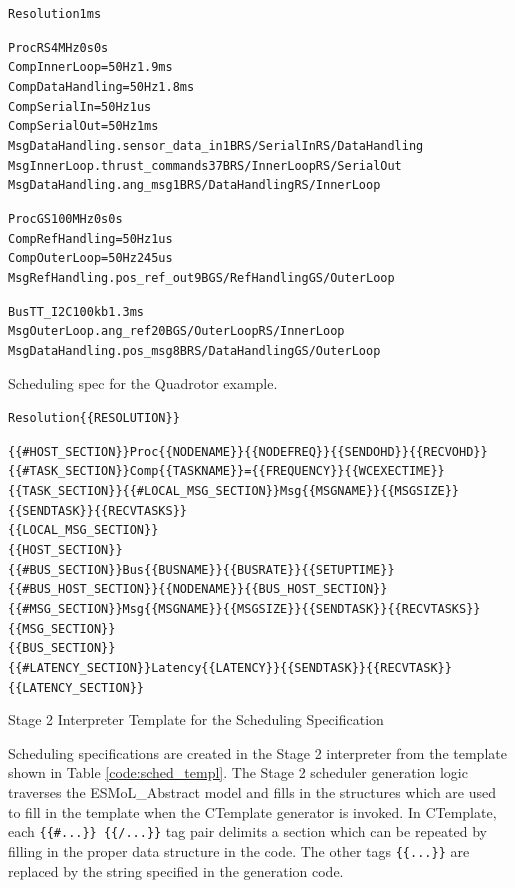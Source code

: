 \begin{table}
\centering
\begin{alltt}
Resolution 1ms

Proc RS 4MHz 0s 0s
Comp InnerLoop =50Hz 1.9ms
Comp DataHandling =50Hz 1.8ms
Comp SerialIn =50Hz 1us
Comp SerialOut =50Hz 1ms
Msg DataHandling.sensor_data_in 1B RS/SerialIn RS/DataHandling 
Msg InnerLoop.thrust_commands 37B RS/InnerLoop RS/SerialOut
Msg DataHandling.ang_msg 1B RS/DataHandling RS/InnerLoop 

Proc GS 100MHz 0s 0s
Comp RefHandling =50Hz 1us
Comp OuterLoop =50Hz 245us
Msg RefHandling.pos_ref_out 9B GS/RefHandling GS/OuterLoop 

Bus TT_I2C 100kb 1.3ms
Msg OuterLoop.ang_ref 20B GS/OuterLoop RS/InnerLoop 
Msg DataHandling.pos_msg 8B RS/DataHandling GS/OuterLoop 
\end{alltt}
\caption{Scheduling spec for the Quadrotor example.}
\label{code:qr_spec}
\end{table}

\begin{table}
\centering
\begin{alltt}
\scriptsize
Resolution \{\{RESOLUTION\}\}

\{\{\#HOST_SECTION\}\}Proc \{\{NODENAME\}\} \{\{NODEFREQ\}\} \{\{SENDOHD\}\} \{\{RECVOHD\}\}
\{\{\#TASK_SECTION\}\}Comp \{\{TASKNAME\}\} =\{\{FREQUENCY\}\} \{\{WCEXECTIME\}\}
\{\{\/TASK_SECTION\}\}\{\{\#LOCAL_MSG_SECTION\}\}Msg \{\{MSGNAME\}\} \{\{MSGSIZE\}\} \{\{SENDTASK\}\} \{\{RECVTASKS\}\}
\{\{\/LOCAL_MSG_SECTION\}\}
\{\{\/HOST_SECTION\}\}
\{\{\#BUS_SECTION\}\}Bus \{\{BUSNAME\}\} \{\{BUSRATE\}\} \{\{SETUPTIME\}\} \{\{\#BUS_HOST_SECTION\}\}\{\{NODENAME\}\} \{\{\/BUS_HOST_SECTION\}\}
\{\{\#MSG_SECTION\}\}Msg \{\{MSGNAME\}\} \{\{MSGSIZE\}\} \{\{SENDTASK\}\} \{\{RECVTASKS\}\}
\{\{\/MSG_SECTION\}\}
\{\{\/BUS_SECTION\}\}
\{\{\#LATENCY_SECTION\}\}Latency \{\{LATENCY\}\} \{\{SENDTASK\}\} \{\{RECVTASK\}\}
\{\{\/LATENCY_SECTION\}\}
\end{alltt}
\caption{Stage 2 Interpreter Template for the Scheduling Specification}
\label{code:sched_templ}
\end{table}

Scheduling specifications are created in the Stage 2 interpreter from
the template shown in Table \ref{code:sched_templ}.
The Stage 2 scheduler generation logic traverses the 
ESMoL\_Abstract model and fills in the structures
which are used to fill in the template when the 
CTemplate generator is invoked.  
In CTemplate, each \verb${{#...}} {{/...}}$ tag pair delimits a 
section which can be repeated by filling in the proper data 
structure in the code.  The other tags \verb${{...}}$ are 
replaced by the string specified in the generation code. 

